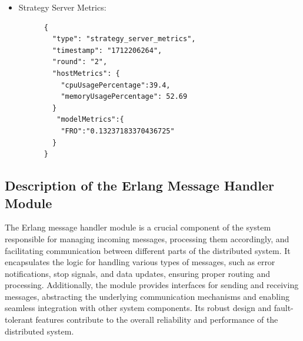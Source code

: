 \begin{itemize}
    \item Strategy Server Metrics:
      \begin{verbatim}
      {
        "type": "strategy_server_metrics",
        "timestamp": "1712206264",
        "round": "2",
        "hostMetrics": {
          "cpuUsagePercentage":39.4,
          "memoryUsagePercentage": 52.69
        }
         "modelMetrics":{
          "FRO":"0.13237183370436725"
        }
      }
    \end{verbatim}
\end{itemize}

\subsection{Description of the Erlang Message Handler Module}
The Erlang message handler module is a crucial component of the system responsible for managing incoming messages, processing them accordingly, and facilitating communication between different parts of the distributed system. It encapsulates the logic for handling various types of messages, such as error notifications, stop signals, and data updates, ensuring proper routing and processing. Additionally, the module provides interfaces for sending and receiving messages, abstracting the underlying communication mechanisms and enabling seamless integration with other system components. Its robust design and fault-tolerant features contribute to the overall reliability and performance of the distributed system.